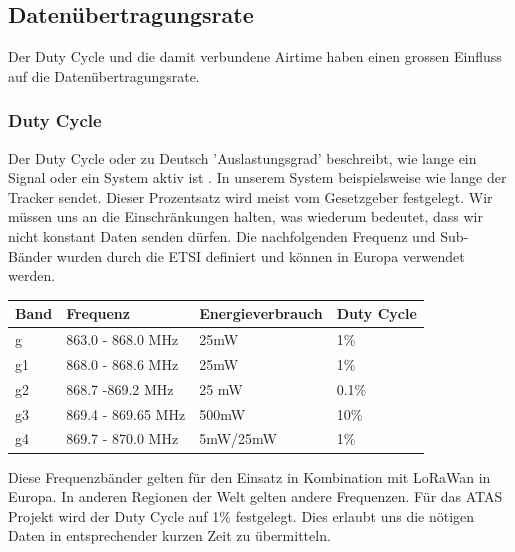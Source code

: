 \documentclass[11pt,english,german]{report}
\theoremstyle{definition}
\begin{document}
\subsection{Datenübertragungsrate}
Der Duty Cycle und die damit verbundene Airtime haben einen grossen Einfluss auf die Datenübertragungsrate. 
\subsubsection{Duty Cycle}
Der Duty Cycle oder zu Deutsch 'Auslastungsgrad' beschreibt, wie lange ein Signal oder ein System aktiv ist \cite{wikiduty}. In unserem System beispielsweise wie lange der Tracker sendet. Dieser Prozentsatz wird meist vom Gesetzgeber festgelegt. Wir müssen uns an die Einschränkungen halten, was wiederum bedeutet, dass wir nicht konstant Daten senden dürfen. Die nachfolgenden Frequenz und Sub-Bänder wurden durch die ETSI definiert und können in Europa verwendet werden\cite{lorawanfreq}.

\begin{tabularx}{\linewidth}{XXXX}
	\textbf{Band} & \textbf{Frequenz} & \textbf{Energieverbrauch} & \textbf{Duty Cycle} \\ \hline
	g &863.0 - 868.0 MHz & 25mW&1\%\\ \hline
	g1 &868.0 - 868.6 MHz & 25mW& 1\%\\ \hline
	g2 &868.7 -869.2 MHz & 25 mW& 0.1\%\\ \hline
	g3 &869.4 - 869.65 MHz & 500mW& 10\%\\ \hline
	g4 &869.7 - 870.0 MHz & 5mW/25mW& 1\%\\ \hline
\end{tabularx} 
\noindent
Diese Frequenzbänder gelten für den Einsatz in Kombination mit LoRaWan in Europa. In anderen Regionen der Welt gelten andere Frequenzen. Für das ATAS Projekt wird der Duty Cycle auf 1\% festgelegt. Dies erlaubt uns die nötigen Daten in entsprechender kurzen Zeit zu übermitteln.

\newpage
\end{document}
